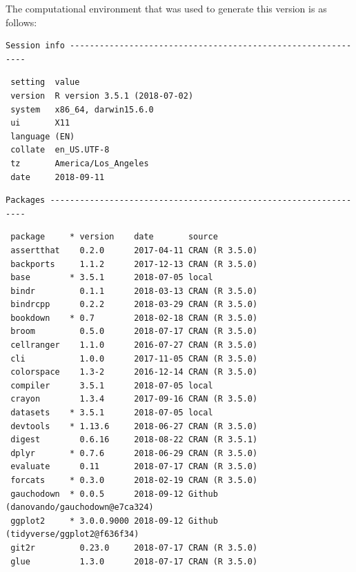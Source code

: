 \documentclass[proquest,12pt,final]{ucthesis-CA2012} %
\begin{document}
\begin{ucmainmatter}
The computational environment that was used to generate this version is
as follows:
\begin{verbatim}
Session info -------------------------------------------------------------
\end{verbatim}
\begin{verbatim}
 setting  value                       
 version  R version 3.5.1 (2018-07-02)
 system   x86_64, darwin15.6.0        
 ui       X11                         
 language (EN)                        
 collate  en_US.UTF-8                 
 tz       America/Los_Angeles         
 date     2018-09-11                  
\end{verbatim}
\begin{verbatim}
Packages -----------------------------------------------------------------
\end{verbatim}
\begin{verbatim}
 package     * version    date       source                               
 assertthat    0.2.0      2017-04-11 CRAN (R 3.5.0)                       
 backports     1.1.2      2017-12-13 CRAN (R 3.5.0)                       
 base        * 3.5.1      2018-07-05 local                                
 bindr         0.1.1      2018-03-13 CRAN (R 3.5.0)                       
 bindrcpp      0.2.2      2018-03-29 CRAN (R 3.5.0)                       
 bookdown    * 0.7        2018-02-18 CRAN (R 3.5.0)                       
 broom         0.5.0      2018-07-17 CRAN (R 3.5.0)                       
 cellranger    1.1.0      2016-07-27 CRAN (R 3.5.0)                       
 cli           1.0.0      2017-11-05 CRAN (R 3.5.0)                       
 colorspace    1.3-2      2016-12-14 CRAN (R 3.5.0)                       
 compiler      3.5.1      2018-07-05 local                                
 crayon        1.3.4      2017-09-16 CRAN (R 3.5.0)                       
 datasets    * 3.5.1      2018-07-05 local                                
 devtools    * 1.13.6     2018-06-27 CRAN (R 3.5.0)                       
 digest        0.6.16     2018-08-22 CRAN (R 3.5.1)                       
 dplyr       * 0.7.6      2018-06-29 CRAN (R 3.5.0)                       
 evaluate      0.11       2018-07-17 CRAN (R 3.5.0)                       
 forcats     * 0.3.0      2018-02-19 CRAN (R 3.5.0)                       
 gauchodown  * 0.0.5      2018-09-12 Github (danovando/gauchodown@e7ca324)
 ggplot2     * 3.0.0.9000 2018-09-12 Github (tidyverse/ggplot2@f636f34)   
 git2r         0.23.0     2018-07-17 CRAN (R 3.5.0)                       
 glue          1.3.0      2018-07-17 CRAN (R 3.5.0)                       

\end{verbatim}
\end{ucmainmatter}
\end{document}
